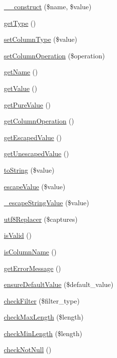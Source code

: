 \begin{DoxyCompactItemize}
\item 
\hyperlink{classArgument_a13dce334d53d3390be4414d7de3b8857}{\-\_\-\-\_\-construct} (\$name, \$value)
\item 
\hyperlink{classArgument_a62ea3d6e7689c8a40f6f9722e76fa7a8}{get\-Type} ()
\item 
\hyperlink{classArgument_a849c6abe0d16f2fdf21c38db6844bd9d}{set\-Column\-Type} (\$value)
\item 
\hyperlink{classArgument_a3e737e0b4af5559f56b35c7c1b1b4f2a}{set\-Column\-Operation} (\$operation)
\item 
\hyperlink{classArgument_a592176260424f46cf1b83bf2eb14014e}{get\-Name} ()
\item 
\hyperlink{classArgument_a53b70d0071096047437015737d5d7728}{get\-Value} ()
\item 
\hyperlink{classArgument_a54140067b590d8ce8dcd7d09f56519cd}{get\-Pure\-Value} ()
\item 
\hyperlink{classArgument_a8720ec6d3b4cccdb6dfdd072bb77c9d3}{get\-Column\-Operation} ()
\item 
\hyperlink{classArgument_a02ee73fa63dd2cd754412f176dae54da}{get\-Escaped\-Value} ()
\item 
\hyperlink{classArgument_a45a70c173c816e9cf2c7c5f396a92a6f}{get\-Unescaped\-Value} ()
\item 
\hyperlink{classArgument_a6fa3a8b473d05a02c7746a143e51ef81}{to\-String} (\$value)
\item 
\hyperlink{classArgument_a217bae48930e0208210aa7030a2f2b27}{escape\-Value} (\$value)
\item 
\hyperlink{classArgument_afd7b071db98f0a4c8ef60cdd8db8a3b2}{\-\_\-escape\-String\-Value} (\$value)
\item 
\hyperlink{classArgument_aaf7f8b67195ed2e1b404339d107d6a1c}{utf8\-Replacer} (\$captures)
\item 
\hyperlink{classArgument_a3e07b6c495166e96aea4e4f90bb0fe53}{is\-Valid} ()
\item 
\hyperlink{classArgument_aced37db9a6cf1ec57e8acdea23797927}{is\-Column\-Name} ()
\item 
\hyperlink{classArgument_a6e75159f2fad478ff488bf9cff5ba139}{get\-Error\-Message} ()
\item 
\hyperlink{classArgument_a4af92bc005f3d9328c63c0722fd3aef7}{ensure\-Default\-Value} (\$default\-\_\-value)
\item 
\hyperlink{classArgument_a4bdf58953a9b85a8999edabe5d341d43}{check\-Filter} (\$filter\-\_\-type)
\item 
\hyperlink{classArgument_acc5f170121988acf71c50e5941320112}{check\-Max\-Length} (\$length)
\item 
\hyperlink{classArgument_ac44c716b86dc42d5c0f0e4717a510c74}{check\-Min\-Length} (\$length)
\item 
\hyperlink{classArgument_a09edcec0bf4dbfeedec2f7652e44e57d}{check\-Not\-Null} ()
\end{DoxyCompactItemize}
